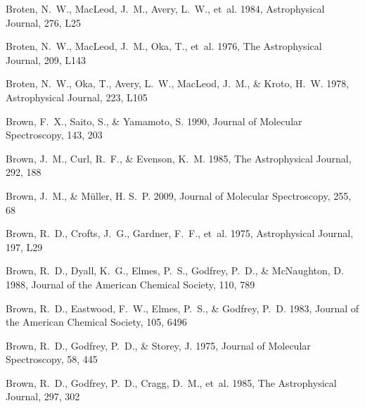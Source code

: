 \documentclass[twocolumn]{aastex631}
\begin{document}
\begin{thebibliography}{}
Broten, N.~W., MacLeod, J.~M., Avery, L.~W., {et~al.} 1984, Astrophysical
  Journal, 276, L25

Broten, N.~W., MacLeod, J.~M., Oka, T., {et~al.} 1976, The Astrophysical
  Journal, 209, L143

Broten, N.~W., Oka, T., Avery, L.~W., MacLeod, J.~M., \& Kroto, H.~W. 1978,
  Astrophysical Journal, 223, L105

Brown, F.~X., Saito, S., \& Yamamoto, S. 1990, Journal of Molecular
  Spectroscopy, 143, 203

Brown, J.~M., Curl, R.~F., \& Evenson, K.~M. 1985{}, The
  Astrophysical Journal, 292, 188

Brown, J.~M., \& M{\"u}ller, H. S.~P. 2009, Journal of Molecular Spectroscopy,
  255, 68

Brown, R.~D., Crofts, J.~G., Gardner, F.~F., {et~al.} 1975{},
  Astrophysical Journal, 197, L29

Brown, R.~D., Dyall, K.~G., Elmes, P.~S., Godfrey, P.~D., \& McNaughton, D.
  1988, Journal of the American Chemical Society, 110, 789

Brown, R.~D., Eastwood, F.~W., Elmes, P.~S., \& Godfrey, P.~D. 1983, Journal of
  the American Chemical Society, 105, 6496

Brown, R.~D., Godfrey, P.~D., \& Storey, J. 1975{}, Journal of
  Molecular Spectroscopy, 58, 445

Brown, R.~D., Godfrey, P.~D., Cragg, D.~M., {et~al.} 1985{}, The
  Astrophysical Journal, 297, 302


\end{thebibliography}
\end{document}
